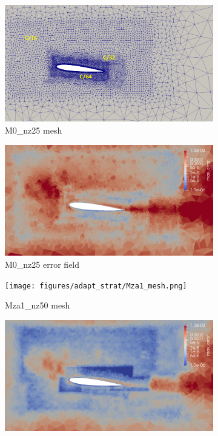 \begin{figure}[H]
\centering
\begin{subfigure}[b]{0.475\textwidth}
\centering
\includegraphics[width=1\textwidth]{figures/adapt_strat/M0_mesh.png}
\caption{M0\_nz25 mesh}
\label{fig:M0_mesh}
\end{subfigure}
\begin{subfigure}[b]{0.475\textwidth}
\centering
\includegraphics[width=1\textwidth]{figures/adapt_strat/M0_error.png}
\caption{M0\_nz25 error field}
\label{fig:M0_err_plot}
\end{subfigure}
\begin{subfigure}[b]{0.475\textwidth}
\centering
\texttt{[image: figures/adapt\_strat/Mza1\_mesh.png]}
\caption{Mza1\_nz50 mesh}
\label{fig:Mza1_mesh}
\end{subfigure}
\begin{subfigure}[b]{0.475\textwidth}
\centering
\includegraphics[width=1\textwidth]{figures/adapt_strat/Mza1_error.png}

\end{subfigure}
\end{figure}
